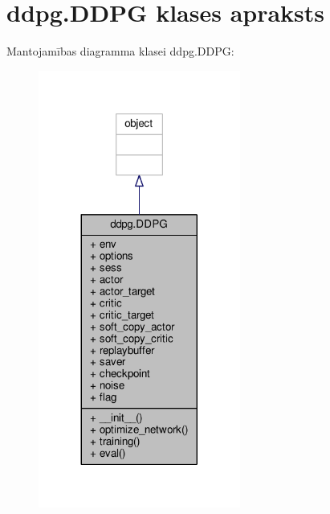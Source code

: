 \hypertarget{classddpg_1_1_d_d_p_g}{}\section{ddpg.\+D\+D\+PG klases apraksts}
\label{classddpg_1_1_d_d_p_g}


Mantojamības diagramma klasei ddpg.\+D\+D\+PG\+:
\nopagebreak
\begin{figure}[H]
\begin{center}
\leavevmode
\includegraphics[width=188pt]{classddpg_1_1_d_d_p_g__inherit__graph}
\end{center}
\end{figure}



